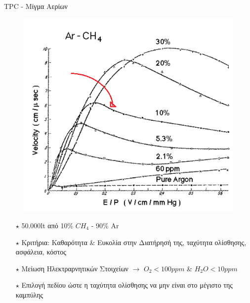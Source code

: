 \documentclass[18pt,notheorems,hyperref={pdfauthor=whatever}]{beamer}
\begin{document}
\begin{frame}{TPC - Mίγμα Αερίων}
    \begin{minipage}{0.55\textwidth}
        \begin{figure}
            \centering
            \includegraphics[scale=0.6]{images/TPC_gases.png}
        \end{figure}
    \end{minipage}
         \begin{minipage}{0.4\textwidth}
        \begin{itemize}
            \item[$\star$] 50.000lt  από 10\% $CH_4$ - 90\% Ar 
            \item[$\star$] Κριτήρια: Καθαρότητα \& Ευκολία στην Διατήρησή της, ταχύτητα ολίσθησης, ασφάλεια, κόστος
            \item[$\star$] Μείωση Ηλεκτραρνητικών Στοιχείων $\rightarrow$ $O_2<100ppm$ \& $H_2O<10ppm$ 
            \item[$\star$] Eπιλογή πεδίου ώστε η ταχύτητα ολίσθησης να μην είναι στο μέγιστο της καμπύλης
        \end{itemize}
    \end{minipage}
\end{frame}
\end{document}
